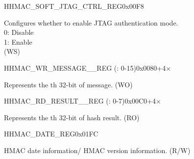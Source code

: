     \begin{register}{H}{HMAC\_SOFT\_JTAG\_CTRL\_REG}{0x00F8}\label{regdesc:HMACSOFTJTAGCTRLREG}
    \regnewline%
    \begin{regdesc}\begin{reglist}
    \label{fielddesc:HMACSOFTJTAGCTRL}\item [HMAC\_SOFT\_JTAG\_CTRL] Configures whether to enable JTAG authentication mode.
    \\0: Disable
    \\1: Enable
    \\ (WS)
    \end{reglist}\end{regdesc}
    \end{register}


    \begin{register}{H}{HMAC\_WR\_MESSAGE\_\_REG (: 0-15)}{0x0080+4×}\label{regdesc:HMACWRMESSAGENREG}
    \regnewline%
    \begin{regdesc}\begin{reglist}
    \label{fielddesc:HMACWDATAN}\item [HMAC\_WDATA\_\regindex{n}] Represents the th 32-bit of message. (WO)
    \end{reglist}\end{regdesc}
    \end{register}


    \begin{register}{H}{HMAC\_RD\_RESULT\_\_REG (: 0-7)}{0x00C0+4×}\label{regdesc:HMACRDRESULTNREG}
    \regnewline%
    \begin{regdesc}\begin{reglist}
    \label{fielddesc:HMACRDATAN}\item [HMAC\_RDATA\_\regindex{n}] Represents the th 32-bit of hash result. (RO)
    \end{reglist}\end{regdesc}
    \end{register}

    \begin{register}{H}{HMAC\_DATE\_REG}{0x01FC}\label{regdesc:HMACDATEREG}
    \regnewline%
    \begin{regdesc}\begin{reglist}
    \label{fielddesc:HMACDATE}\item [HMAC\_DATE] HMAC date information/ HMAC version information. (R/W)
    \end{reglist}\end{regdesc}
    \end{register}
